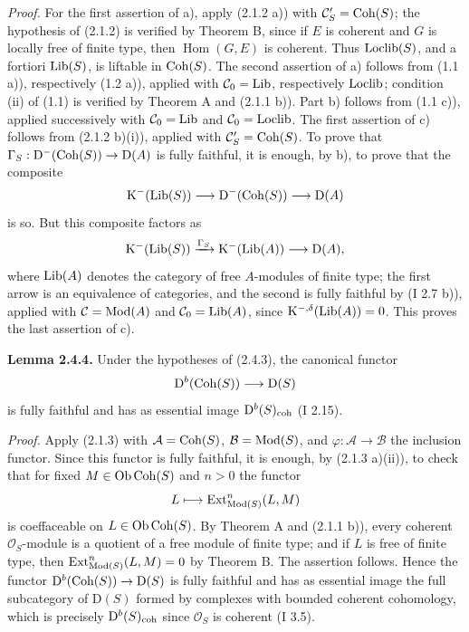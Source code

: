 \documentclass[11pt]{article}
\begin{document}
\emph{Proof.} For the first assertion of a), apply (2.1.2 a)) with $\mathcal C'_S=\operatorname{Coh}(S)$; the hypothesis of (2.1.2) is verified by Theorem B, since if $E$ is coherent and $G$ is locally free of finite type, then $\operatorname{Hom}(G,E)$ is coherent. Thus $\operatorname{Loclib}(S)$, and a fortiori $\operatorname{Lib}(S)$, is liftable in $\operatorname{Coh}(S)$. The second assertion of a) follows from (1.1 a)), respectively (1.2 a)), applied with $\mathcal C_0=\operatorname{Lib}$, respectively $\operatorname{Loclib}$; condition (ii) of (1.1) is verified by Theorem A and (2.1.1 b)). Part b) follows from (1.1 c)), applied successively with $\mathcal C_0=\operatorname{Lib}$ and $\mathcal C_0=\operatorname{Loclib}$. The first assertion of c) follows from (2.1.2 b)(i)), applied with $\mathcal C'_S=\operatorname{Coh}(S)$. To prove that $\Gamma_S:\mathrm D^{-}(\operatorname{Coh}(S))\to\mathrm D(A)$ is fully faithful, it is enough, by b), to prove that the composite
\[
\mathrm K^{-}(\operatorname{Lib}(S))\longrightarrow\mathrm D^{-}(\operatorname{Coh}(S))\longrightarrow\mathrm D(A)
\]
is so. But this composite factors as
\[
\mathrm K^{-}(\operatorname{Lib}(S))\xrightarrow{\Gamma_S}\mathrm K^{-}(\operatorname{Lib}(A))\longrightarrow\mathrm D(A),
\]
where $\operatorname{Lib}(A)$ denotes the category of free $A$-modules of finite type; the first arrow is an equivalence of categories, and the second is fully faithful by (I 2.7 b)), applied with $\mathcal C=\operatorname{Mod}(A)$ and $\mathcal C_0=\operatorname{Lib}(A)$, since $\mathrm K^{-,\delta}(\operatorname{Lib}(A))=0$. This proves the last assertion of c).

\textbf{Lemma 2.4.4.} Under the hypotheses of (2.4.3), the canonical functor
\[
\mathrm D^b(\operatorname{Coh}(S))\longrightarrow\mathrm D(S)
\]
is fully faithful and has as essential image $\mathrm D^b(S)_{\mathrm{coh}}$ (I 2.15).

\emph{Proof.} Apply (2.1.3) with $\mathcal A=\operatorname{Coh}(S)$, $\mathcal B=\operatorname{Mod}(S)$, and $\varphi:\mathcal A\to\mathcal B$ the inclusion functor. Since this functor is fully faithful, it is enough, by (2.1.3 a)(ii)), to check that for fixed $M\in\operatorname{Ob}\operatorname{Coh}(S)$ and $n>0$ the functor
\[
L\longmapsto \operatorname{Ext}^n_{\operatorname{Mod}(S)}(L,M)
\]
is coeffaceable on $L\in\operatorname{Ob}\operatorname{Coh}(S)$. By Theorem A and (2.1.1 b)), every coherent $\mathcal O_S$-module is a quotient of a free module of finite type; and if $L$ is free of finite type, then $\operatorname{Ext}^n_{\operatorname{Mod}(S)}(L,M)=0$ by Theorem B. The assertion follows. Hence the functor $\mathrm D^b(\operatorname{Coh}(S))\to\mathrm D(S)$ is fully faithful and has as essential image the full subcategory of $\mathrm D(S)$ formed by complexes with bounded coherent cohomology, which is precisely $\mathrm D^b(S)_{\mathrm{coh}}$ since $\mathcal O_S$ is coherent (I 3.5).
\end{document}
